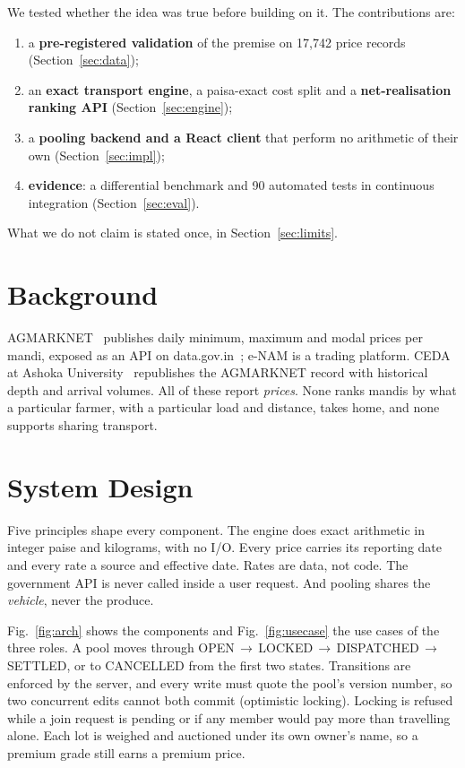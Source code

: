 \documentclass[conference]{IEEEtran}
\newcommand{\TestsAll}{90}
\begin{document}
We tested whether the idea was true before building on it. The
contributions are:
\begin{enumerate}
    \item a \textbf{pre-registered validation} of the premise on 17,742
    price records (Section~\ref{sec:data});
    \item an \textbf{exact transport engine}, a paisa-exact cost split and
    a \textbf{net-realisation ranking API} (Section~\ref{sec:engine});
    \item a \textbf{pooling backend and a React client} that perform no
    arithmetic of their own (Section~\ref{sec:impl});
    \item \textbf{evidence}: a differential benchmark and \TestsAll{}
    automated tests in continuous integration (Section~\ref{sec:eval}).
\end{enumerate}
What we do not claim is stated once, in Section~\ref{sec:limits}.

\section{Background}
\label{sec:background}
AGMARKNET~\cite{agmarknet} publishes daily minimum, maximum and modal
prices per mandi, exposed as an API on data.gov.in~\cite{datagov}; e-NAM
\cite{enam} is a trading platform. CEDA at Ashoka University~\cite{ceda}
republishes the AGMARKNET record with historical depth and arrival
volumes. All of these report \emph{prices}. None ranks mandis by what a
particular farmer, with a particular load and distance, takes home, and
none supports sharing transport.

\section{System Design}
\label{sec:design}
Five principles shape every component. The engine does exact arithmetic
in integer paise and kilograms, with no I/O. Every price carries its
reporting date and every rate a source and effective date. Rates are
data, not code. The government API is never called inside a user
request. And pooling shares the \emph{vehicle}, never the produce.

Fig.~\ref{fig:arch} shows the components and Fig.~\ref{fig:usecase} the
use cases of the three roles. A pool moves through
OPEN\,$\rightarrow$\,LOCKED\,$\rightarrow$\,DISPATCHED\,$\rightarrow$\,SETTLED,
or to CANCELLED from the first two states. Transitions are enforced by the
server, and every write must quote the pool's version number, so two
concurrent edits cannot both commit (optimistic locking). Locking is
refused while a join request is pending or if any member would pay more
than travelling alone. Each lot is weighed and auctioned under its own
owner's name, so a premium grade still earns a premium price.
\end{document}
